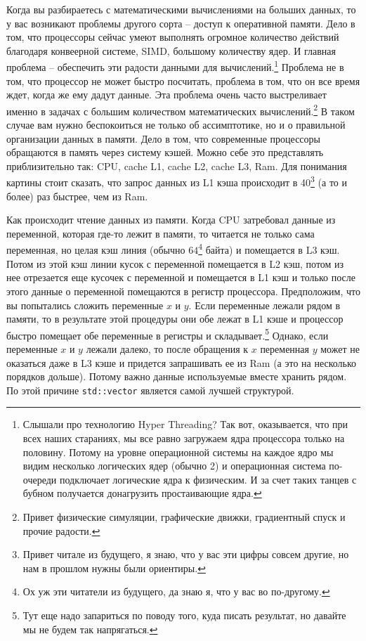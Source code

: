 \documentclass{article}
\begin{document}
Когда вы разбираетесь с математическими вычислениями на больших данных, то у вас возникают проблемы другого сорта -- доступ к оперативной памяти. Дело в том, что процессоры сейчас умеют выполнять огромное количество действий благодаря конвеерной системе, SIMD, большому количеству ядер. И главная проблема -- обеспечить эти радости данными для вычислений.\footnote{Слышали про технологию Hyper Threading? Так вот, оказывается, что при всех наших стараниях, мы все равно загружаем ядра процессора только на половину. Потому на уровне операционной системы на каждое ядро мы видим несколько логических ядер (обычно 2) и операционная система по-очереди подключает логические ядра к физическим. И за счет таких танцев с бубном получается донагрузить простаивающие ядра.} Проблема не в том, что процессор не может быстро посчитать, проблема в том, что он все время ждет, когда же ему дадут данные. Эта проблема очень часто выстреливает именно в задачах с большим количеством математических вычислений.\footnote{Привет физические симуляции, графические движки, градиентный спуск и прочие радости.} В таком случае вам нужно беспокоиться не только об ассимптотике, но и о правильной организации данных в памяти. Дело в том, что современные процессоры обращаются в память через систему кэшей. Можно себе это представлять приблизительно так: CPU, cache L1, cache L2, cache L3, Ram. Для понимания картины стоит сказать, что запрос данных из L1 кэша происходит в 40\footnote{Привет читале из будущего, я знаю, что у вас эти цифры совсем другие, но нам в прошлом нужны были ориентиры.} (а то и более) раз быстрее, чем из Ram. 

Как происходит чтение данных из памяти. Когда CPU затребовал данные из переменной, которая где-то лежит в памяти, то читается не только сама переменная, но целая кэш линия (обычно $64$\footnote{Ох уж эти читатели из будущего, да знаю я, что у вас во по-другому.} байта) и помещается в L3 кэш. Потом из этой кэш линии кусок с переменной помещается в L2 кэш, потом из нее отрезается еще кусочек с переменной и помещается в L1 кэш и только после этого данные о переменной помещаются в регистр процессора. Предположим, что вы попытались сложить переменные $x$ и $y$. Если переменные лежали рядом в памяти, то в результате этой процедуры они обе лежат в L1 кэше и процессор быстро помещает обе переменные в регистры и складывает.\footnote{Тут еще надо запариться по поводу того, куда писать результат, но давайте мы не будем так напрягаться.} Однако, если переменные $x$ и $y$ лежали далеко, то после обращения к $x$ переменная $y$ может не оказаться даже в L3 кэше и придется запрашивать ее из Ram (а это на несколько порядков дольше). Потому важно данные используемые вместе хранить рядом. По этой причине \verb"std::vector" является самой лучшей структурой.
\end{document}
